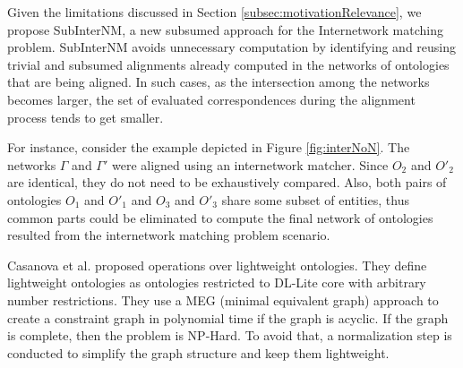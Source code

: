 \documentclass{llncs}
\begin{document}
Given the limitations discussed in Section \ref{subsec:motivationRelevance}, we propose SubInterNM, a new subsumed approach for the Internetwork matching problem. SubInterNM avoids unnecessary computation by identifying and reusing trivial and subsumed alignments already computed in the networks of ontologies that are being aligned. In such cases, as the intersection among the networks becomes larger, the set of evaluated correspondences during the alignment process tends to get smaller. %

For instance, consider the example depicted in Figure \ref{fig:interNoN}. The networks $\Gamma$ and $\Gamma'$ were aligned using an internetwork matcher. Since $O_{2}$ and $O'_{2}$ are identical, they do not need to be exhaustively compared. Also, both pairs of ontologies $O_{1}$ and $O'_{1}$ and $O_{3}$ and $O'_{3}$ share some subset of entities, thus common parts could be eliminated to compute the final network of ontologies resulted from the internetwork matching problem scenario.

Casanova et al. \cite{casanova2012operations} proposed operations over lightweight ontologies. They define lightweight ontologies as ontologies restricted to DL-Lite core with arbitrary number restrictions. They use a MEG (minimal equivalent graph) approach to create a constraint graph in polynomial time if the graph is acyclic. If the graph is complete, then the problem is NP-Hard. To avoid that, a normalization step is conducted to simplify the graph structure and keep them lightweight. 
\end{document}
